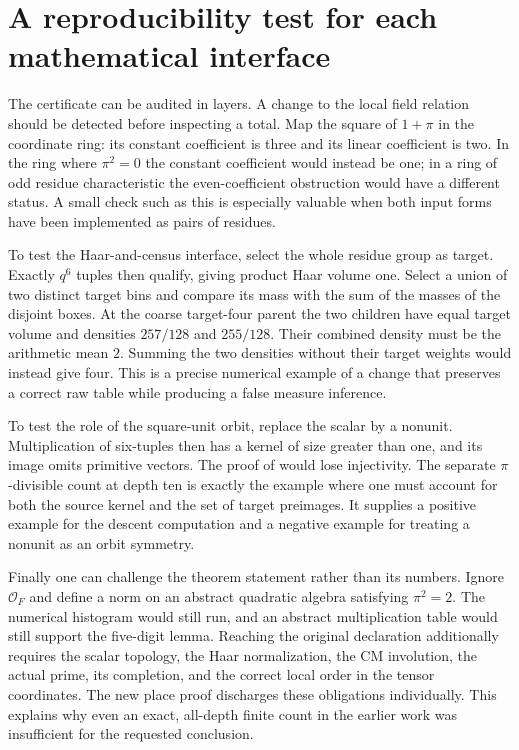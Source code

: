 \documentclass[12pt,letterpaper]{article}
\newcommand{\code}[1]{\texttt{\detokenize{#1}}}
\begin{document}
\section{A reproducibility test for each mathematical interface}
The certificate can be audited in layers. A change to the local field relation should be detected before inspecting a total. Map the square of $1+\pi$ in the coordinate ring: its constant coefficient is three and its linear coefficient is two. In the ring where $\pi^2=0$ the constant coefficient would instead be one; in a ring of odd residue characteristic the even-coefficient obstruction would have a different status. A small check such as this is especially valuable when both input forms have been implemented as pairs of residues.
\par
To test the Haar-and-census interface, select the whole residue group as target. Exactly $q^6$ tuples then qualify, giving product Haar volume one. Select a union of two distinct target bins and compare its mass with the sum of the masses of the disjoint boxes. At the coarse target-four parent the two children have equal target volume and densities $257/128$ and $255/128$. Their combined density must be the arithmetic mean $2$. Summing the two densities without their target weights would instead give four. This is a precise numerical example of a change that preserves a correct raw table while producing a false measure inference.
\par
To test the role of the square-unit orbit, replace the scalar by a nonunit. Multiplication of six-tuples then has a kernel of size greater than one, and its image omits primitive vectors. The proof of \code{scaled} would lose injectivity. The separate $\pi$-divisible count at depth ten is exactly the example where one must account for both the source kernel and the set of target preimages. It supplies a positive example for the descent computation and a negative example for treating a nonunit as an orbit symmetry.
\par
Finally one can challenge the theorem statement rather than its numbers. Ignore $\mathcal O_F$ and define a norm on an abstract quadratic algebra satisfying $\pi^2=2$. The numerical histogram would still run, and an abstract multiplication table would still support the five-digit lemma. Reaching the original declaration additionally requires the scalar topology, the Haar normalization, the CM involution, the actual prime, its completion, and the correct local order in the tensor coordinates. The new place proof discharges these obligations individually. This explains why even an exact, all-depth finite count in the earlier work was insufficient for the requested conclusion.
\end{document}
